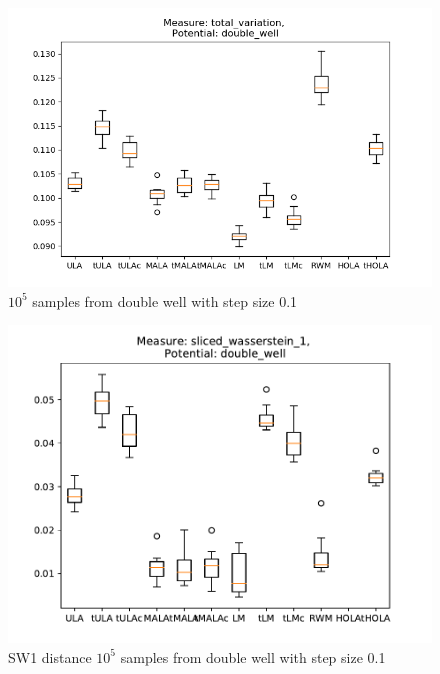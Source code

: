 \begin{figure}[ht!]
	\centering
		\includegraphics[height=0.43\textheight]{WriteUp/TV_doublewell_step0pt1.png}
	\caption{$10^5$ samples from double well with step size 0.1}
	\label{fig:TVdouble1}
\end{figure}

\begin{figure}[ht!]
	\centering
		\includegraphics[height=0.43\textheight]{WriteUp/SW_doublewell_0pt1.pdf}
	\caption{SW1 distance $10^5$ samples from double well with step size 0.1}
	\label{fig:SWdouble1}
\end{figure}

